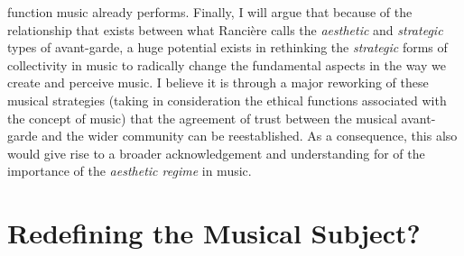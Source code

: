 function music already performs. Finally, I will argue that because of the relationship that exists between what Ranci\`{e}re calls the \emph{aesthetic} and \emph{strategic} types of avant-garde, a huge potential exists in rethinking the \emph{strategic} forms of collectivity in music to radically change the fundamental aspects in the way we create and perceive music. I believe it is through a major reworking of these musical strategies (taking in consideration the ethical functions associated with the concept of music) that the agreement of trust between the musical avant-garde and the wider community can be reestablished. As a consequence, this also would give rise to a broader acknowledgement and understanding for of the importance of the \emph{aesthetic regime} in music.

\section{Redefining the Musical Subject?}

